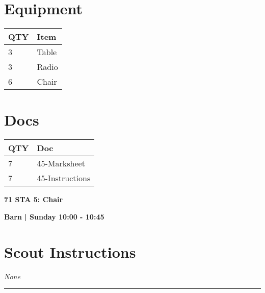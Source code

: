 \documentclass[10pt]{article}
\newcommand{\newtitle}[1]{\begin{center}{\Huge\bfseries #1 }\\ \vspace{5mm}\end{center}}
\newcommand{\newsubtitle}[1]{\begin{center}{\color{grey}\Large\bfseries #1 }\\ \vspace{5mm}\end{center}}
\begin{document}
	\begin{multicols}{2}

		\section*{\faWrench \: Equipment}

		
	\begin{center}
			\begin{tabular}{p{2cm}p{4cm}}


				\textbf{QTY} & \textbf{Item} \\\toprule
												3&Table\\\midrule
												3&Radio\\\midrule
												6&Chair\\\midrule
								\end{tabular}

			\end{center}

		
		\vfill\null
		\columnbreak

			\section*{\faFile \: Docs}
		 	\begin{center}
			\begin{tabular}{p{2cm}p{4cm}}

			\textbf{QTY} & \textbf{Doc} \\\toprule
										7&45-Marksheet\\\midrule
										7&45-Instructions\\\midrule
							\end{tabular}
			\end{center}
	

		\vfill\null

		\end{multicols}



	\vspace{1cm}


	\clearpage
		\newtitle{71 STA 5: Chair }
	\newsubtitle{Barn | Sunday 10:00 - 10:45}
		\setcounter{section}{70}
	\section*{Scout Instructions}
		\textit{None}
	
	\vspace{0.5cm}
	\hrule
	\vspace{0.5cm}
\end{document}
